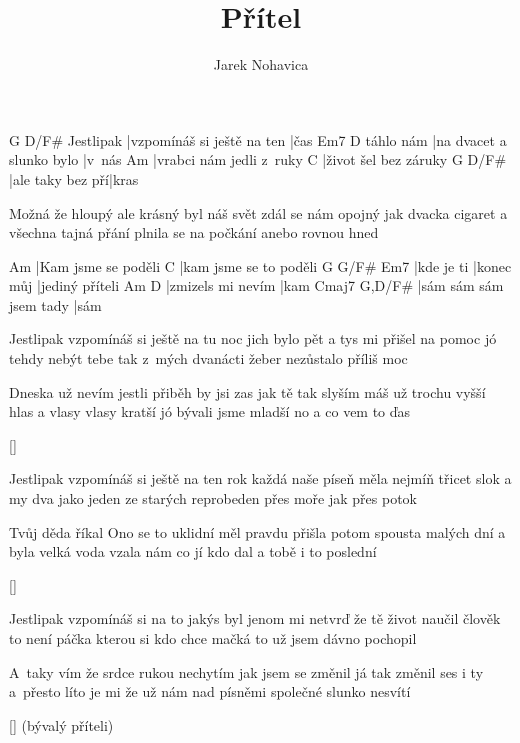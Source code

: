 \documentclass{song}
\author{Jarek Nohavica}
\title{Přítel}
\begin{document}
\begin{multicols}{2}

\strophe
          G                          D/F\#
Jestlipak |vzpomínáš si ještě na ten |čas
          Em7                      D
táhlo nám |na dvacet a slunko bylo |v~nás
Am
|vrabci nám jedli z~ruky
C
|život šel bez záruky
G                D/F\#
|ale taky bez pří|kras
\endstrophe

\strophe*
Možná že hloupý ale krásný byl náš svět
zdál se nám opojný jak dvacka cigaret
a všechna tajná přání
plnila se na počkání
anebo rovnou hned
\endstrophe

Am
|Kam jsme se poděli
C
|kam jsme se to poděli
G          G/F\#      Em7
|kde je ti |konec můj |jediný příteli
Am                D
|zmizels mi nevím |kam
Cmaj7                  G,D/F\#
|sám sám sám jsem tady |sám
\endstrophe

\strophe*
Jestlipak vzpomínáš si ještě na tu noc
jich bylo pět a tys mi přišel na pomoc
jó tehdy nebýt tebe
tak z~mých dvanácti žeber
nezůstalo příliš moc
\endstrophe

\strophe*
Dneska už nevím jestli přiběh by jsi zas
jak tě tak slyším máš už trochu vyšší hlas
a vlasy vlasy kratší
jó bývali jsme mladší
no a co vem to ďas
\endstrophe

\ref{}

\columnbreak

\strophe*
Jestlipak vzpomínáš si ještě na ten rok
každá naše píseň měla nejmíň třicet slok
a my dva jako jeden
ze starých reprobeden
přes moře jak přes potok
\endstrophe

\strophe*
Tvůj děda říkal Ono se to uklidní
měl pravdu přišla potom spousta malých dní
a byla velká voda
vzala nám co jí kdo dal
a tobě i to poslední
\endstrophe

\ref{}

\strophe*
Jestlipak vzpomínáš si na to jakýs byl
jenom mi netvrď že tě život naučil
člověk to není páčka
kterou si kdo chce mačká
to už jsem dávno pochopil
\endstrophe

\strophe*
A~taky vím že srdce rukou nechytím
jak jsem se změnil já tak změnil ses i ty
a~přesto líto je mi
že už nám nad písněmi
společné slunko nesvítí
\endstrophe

\ref{} (bývalý příteli)

\end{multicols}
\end{document}
